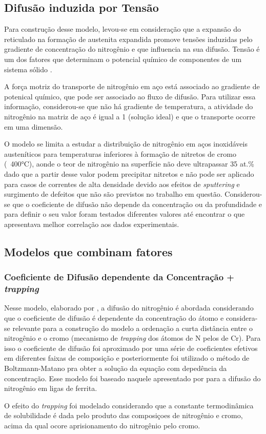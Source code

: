 \documentclass[]{politex}
\begin{document}
\subsection{Difusão induzida por Tensão}
\label{sec:tensao}
	Para construção desse modelo, levou-se em consideração que a expansão do reticulado na formação de austenita expandida promove tensões induzidas pelo gradiente de concentração do nitrogênio e que influencia na sua difusão. Tensão é um dos fatores que determinam o potencial químico de componentes de um sistema sólido \cite{galdikas2010stress}. \par
	 A força motriz do transporte de nitrogênio em aço está associado ao gradiente de potenical químico, que pode ser associado ao fluxo de difusão. Para utilizar essa informação, considerou-se que não há gradiente de temperatura, a atividade do nitrogênio na matriz de aço é igual a 1 (solução ideal) e que o transporte ocorre em uma dimensão. \par
	 O modelo se limita a estudar a distribuição de nitrogênio em aços inoxidáveis austeníticos para temperaturas inferiores à formação de nitretos de cromo (~400°C), aonde o  teor de nitrogênio na superfície não deve ultrapassar 35 at.\% dado que a partir desse valor podem precipitar nitretos e não pode ser aplicado para casos de correntes de alta densidade devido aos efeitos de \textit{sputtering} e surgimento de defeitos que não são previstos no trabalho em questão.
	 Considerou-se que o coeficiente de difusão não depende da concentração ou da profundidade e para definir o seu valor foram testados diferentes valores até encontrar o que apresentava melhor correlação aos dados experimentais.
	 
\subsection{Modelos que combinam fatores}
\subsubsection{Coeficiente de Difusão dependente da Concentração + \textit{trapping}}
\label{sec:comb-depc-td}
	Nesse modelo, elaborado por \cite{christiansen2008nitrogen}, a difusão do nitrogênio é abordada considerando que o coeficiente de difusão é dependente da concentração do átomo  e considera-se relevante para a construção do modelo a ordenação a curta distância entre o nitrogênio e o cromo (mecanismo de \textit{trapping} dos átomos de N pelos de Cr). Para isso o coeficiente de difusão foi aproximado por uma série de coeficientes efetivos em diferentes faixas de composição e posteriormente foi utilizado o método de Boltzmann-Matano pra obter a solução da equação com depedência da concentração. Esse modelo foi baseado naquele apresentado por \cite{sun1997numerical} para a difusão do nitrogênio em ligas de ferrita.\par
	O efeito do \textit{trapping} foi modelado considerando que a constante termodinâmica de solubilidade é dada pelo produto das composiçoes de nitrogênio e cromo, acima da qual ocore aprisionamento do nitrogênio pelo cromo.
	
\end{document}
